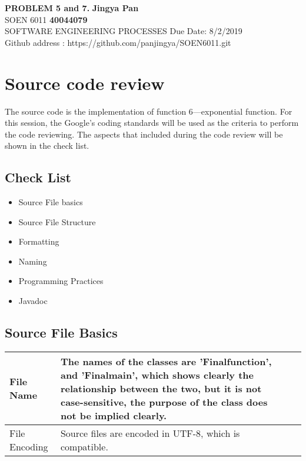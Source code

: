 \documentclass[a4paper, 11pt]{article}
\begin{document}
\noindent
\large\textbf{PROBLEM 5 and 7.} \hfill \textbf{Jingya Pan} \\
\normalsize SOEN 6011 \hfill \textbf{40044079} \\
 SOFTWARE ENGINEERING PROCESSES \hfill Due Date: 8/2/2019 \\
\hfill Github address : https://github.com/panjingya/SOEN6011.git

\section{Source code review}
The source code is the implementation of function 6---exponential function. For this session, the Google's coding standards will be used as the criteria to perform the code reviewing. The aspects that included during the code review will be shown in the check list.
\subsection{Check List}
\begin{itemize}
    \item Source File basics
    \item Source File Structure
    \item Formatting
    \item Naming
    \item Programming Practices
    \item Javadoc
\end{itemize}

\subsection{Source File Basics}
\indent
\begin{center}
\renewcommand\arraystretch{2.0}
\begin{tabularx}{\textwidth}{|%
   >{\hsize=1.0\hsize}X|
   >{\hsize=2.0\hsize}X|
   >{\hsize=0.5\hsize}X|
   >{\hsize=0.5\hsize}X|}
\hline
File Name & The names of the classes are 'Finalfunction', and 'Finalmain', which shows clearly the relationship between the two, but it is not case-sensitive, the purpose of the class does not be implied clearly. \\

\hline
File Encoding & Source files are encoded in UTF-8, which is compatible.\\

\hline
\end{tabularx}
\end{center}
\indent
\end{document}
